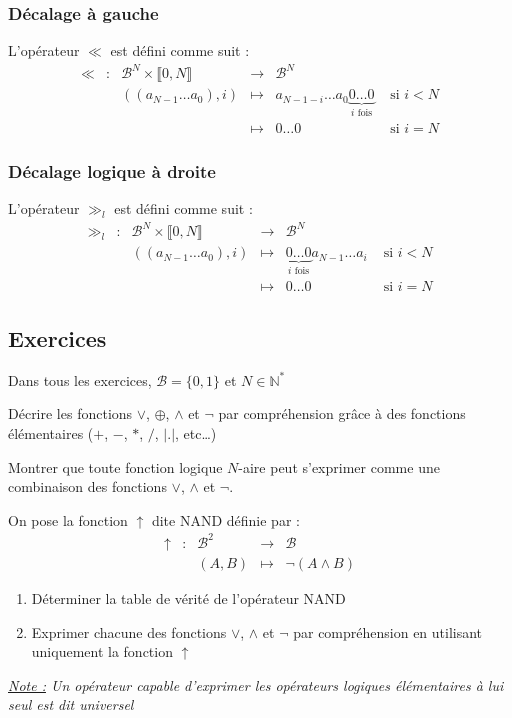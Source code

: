\documentclass[../../main.tex]{subfiles}
\begin{document}
\subsubsection{Décalage à gauche}
\label{ssub:d_calage_gauche}
L'opérateur $\ll$ est défini comme suit :
$$
\begin{array}{lclcll}
\ll & : & \mathcal{B}^{N}\times{\llbracket0, N\rrbracket} & \rightarrow & \mathcal{B}^{N} \\
     &   & ((a_{N-1}\dots a_{0}), i) & \mapsto & a_{N-1-i}\dots a_{0}\underbrace{0\dots 0}_{\text{$i$ fois}} & \text{ si $i < N$} \\
     &   & & \mapsto & 0\dots 0 & \text{ si $i = N$}
\end{array}
$$
\subsubsection{Décalage logique à droite}\label{ssub:d_calage_logique_droite}
L'opérateur $\gg_{l}$ est défini comme suit :
$$
\begin{array}{lclcll}
\gg_{l} & : & \mathcal{B}^{N}\times{\llbracket0, N\rrbracket} & \rightarrow & \mathcal{B}^{N} \\
     &   & ((a_{N-1}\dots a_{0}), i) & \mapsto & \underbrace{0\dots 0}_{\text{$i$ fois}}a_{N-1}\dots a_{i} & \text{ si $i < N$} \\
     &   & & \mapsto & 0\dots 0 & \text{ si $i = N$}
\end{array}
$$
\subsection{Exercices}
Dans tous les exercices, $\mathcal{B} = \{0, 1\}$ et $N\in\mathbb{N}^{*}$

 Décrire les fonctions $\vee$, $\oplus$, $\wedge$ et $\neg$ par compréhension grâce à des fonctions élémentaires ($+$, $-$, $*$, $/$, $|.|$, etc\dots)

 Montrer que toute fonction logique $N$-aire peut s'exprimer comme une combinaison des fonctions $\vee$, $\wedge$ et $\neg$.

 On pose la fonction $\uparrow$ dite \og NAND \fg définie par :
$$
\begin{array}{lclcl}
\uparrow & : & \mathcal{B}^{2} & \rightarrow & \mathcal{B} \\
& & (A, B) & \mapsto & \neg{(A\wedge{B})}
\end{array}
$$
\begin{enumerate}
    \item Déterminer la table de vérité de l'opérateur NAND
    \item Exprimer chacune des fonctions $\vee$, $\wedge$ et $\neg$ par compréhension en utilisant uniquement la fonction $\uparrow$
\end{enumerate}
\textit{\underline{Note :} Un opérateur capable d'exprimer les opérateurs logiques élémentaires à lui seul est dit \og universel \fg}
\end{document}
